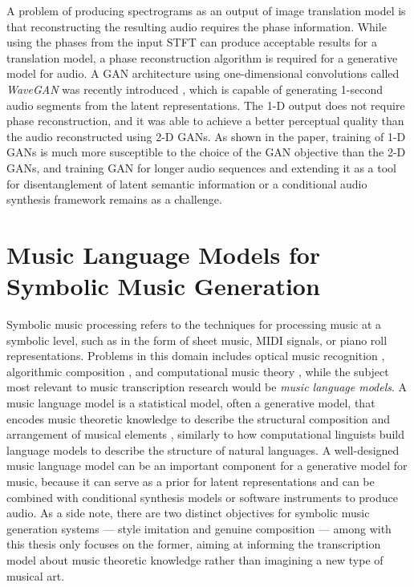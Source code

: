 A problem of producing spectrograms as an output of image translation model is that reconstructing the resulting audio requires the phase information.
While using the phases from the input STFT can produce acceptable results for a translation model, a phase reconstruction algorithm is required for a generative model for audio.
A GAN architecture using one-dimensional convolutions called \emph{WaveGAN} was recently introduced \cite{donahue2018wavegan}, which is capable of generating 1-second audio segments from the latent representations.
The 1-D output does not require phase reconstruction, and it was able to achieve a better perceptual quality than the audio reconstructed using 2-D GANs.
As shown in the paper, training of 1-D GANs is much more susceptible to the choice of the GAN objective than the 2-D GANs, and training GAN for longer audio sequences and extending it as a tool for disentanglement of latent semantic information or a conditional audio synthesis framework remains as a challenge.

\section{Music Language Models for Symbolic Music Generation}

Symbolic music processing refers to the techniques for processing music at a symbolic level, such as in the form of sheet music, MIDI signals, or piano roll representations.
Problems in this domain includes optical music recognition \cite{rebelo2012omr}, algorithmic composition \cite{fernandez2013ai}, and computational music theory \cite{hamanaka2013computational}, while the subject most relevant to music transcription research would be \emph{music language models}.
A music language model is a statistical model, often a generative model, that encodes music theoretic knowledge to describe the structural composition and arrangement of musical elements \cite{patel2010musiclanguage}, similarly to how computational linguists build language models to describe the structure of natural languages.
A well-designed music language model can be an important component for a generative model for music, because it can serve as a prior for latent representations and can be combined with conditional synthesis models or software instruments to produce audio.
As a side note, there are two distinct objectives for symbolic music generation systems --- style imitation and genuine composition \cite{nierhaus2009composition} --- among with this thesis only focuses on the former, aiming at informing the transcription model about music theoretic knowledge rather than imagining a new type of musical art.

